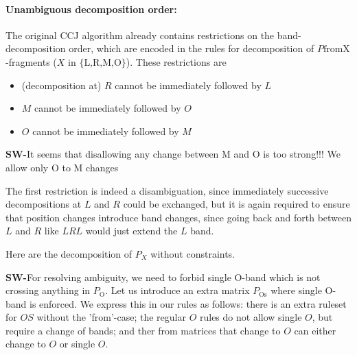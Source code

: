 \documentclass[11pt]{article} %
\newcommand{\SW}[1]{\textbf{SW-}#1}
\newcommand{\POnone}{P_{\text{O}}}
\newcommand{\POSnone}{P_{\text{Os}}}
\begin{document}
\paragraph{Unambiguous decomposition order:}
The original CCJ algorithm already contains restrictions on the band-decomposition order, which are encoded in the rules for decomposition of $P\text{fromX}$-fragments ($X$ in $\{\text{L,R,M,O}\}$). These restrictions are
\begin{itemize}
\item (decomposition at) $R$ cannot be immediately followed by $L$
\item $M$ cannot be immediately followed by $O$ 
\item $O$ cannot be immediately followed by $M$
\end{itemize} 
\SW{It seems that disallowing any change between M and O is too strong!!! We allow only O to M changes}

The first restriction is indeed a disambiguation, since immediately successive decompositions at $L$ and $R$ could be exchanged, but it is again required to ensure that position changes introduce band changes, since going back and forth between $L$ and $R$ like $LRL$ would just extend the $L$ band. 


Here are the decomposition of $P_X$ without constraints.

\SW{For resolving ambiguity, we need to forbid single O-band which is not crossing anything in $\POnone$. Let us introduce an extra matrix $\POSnone$ where single O-band is enforced.
We express this in our rules as follows: there is an extra ruleset for $OS$ without the 'from'-case; the regular $O$ rules do not allow single $O$, but require a change of bands;
and ther from matrices that change to $O$ can either change to $O$ or single $O$.
} 

\end{document}
